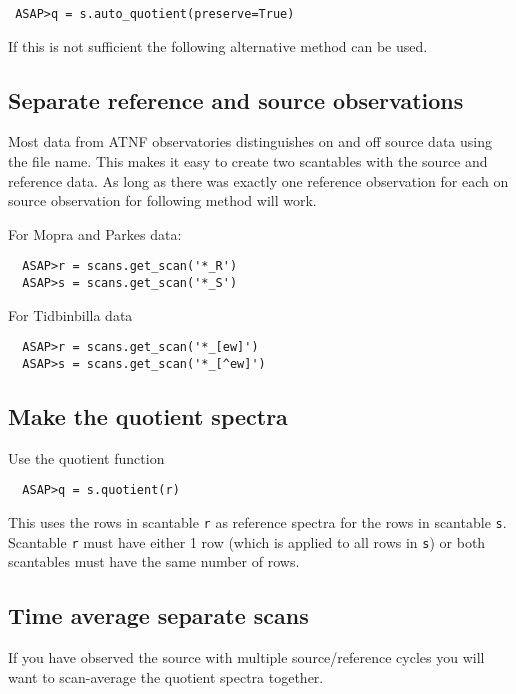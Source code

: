 \documentclass[11pt]{article}
\newcommand{\cmd}[1]{{\tt #1}}
\begin{document}
\begin{verbatim}
 ASAP>q = s.auto_quotient(preserve=True)
\end{verbatim}

If this is not sufficient the following alternative method can be used.

\subsection{Separate reference and source observations}

Most data from ATNF observatories
distinguishes on and off source data using the file name. This makes
it easy to create two scantables with the source and reference
data. As long as there was exactly one reference observation for each
on source observation for following method will work.

For Mopra and Parkes data:
\begin{verbatim}
  ASAP>r = scans.get_scan('*_R')
  ASAP>s = scans.get_scan('*_S')
\end{verbatim}

For Tidbinbilla data
\begin{verbatim}
  ASAP>r = scans.get_scan('*_[ew]')
  ASAP>s = scans.get_scan('*_[^ew]')
\end{verbatim}

\subsection{Make the quotient spectra}

Use the quotient function

\begin{verbatim}
  ASAP>q = s.quotient(r)
\end{verbatim}

This uses the rows in scantable \cmd{r} as reference spectra for the
rows in scantable \cmd{s}. Scantable \cmd{r} must have either 1 row
(which is applied to all rows in \cmd{s}) or both scantables must have
the same number of rows.

\subsection{Time average separate scans}

If you have observed the source with multiple
source/reference cycles you will want to scan-average the quotient
spectra together.
\end{document}
